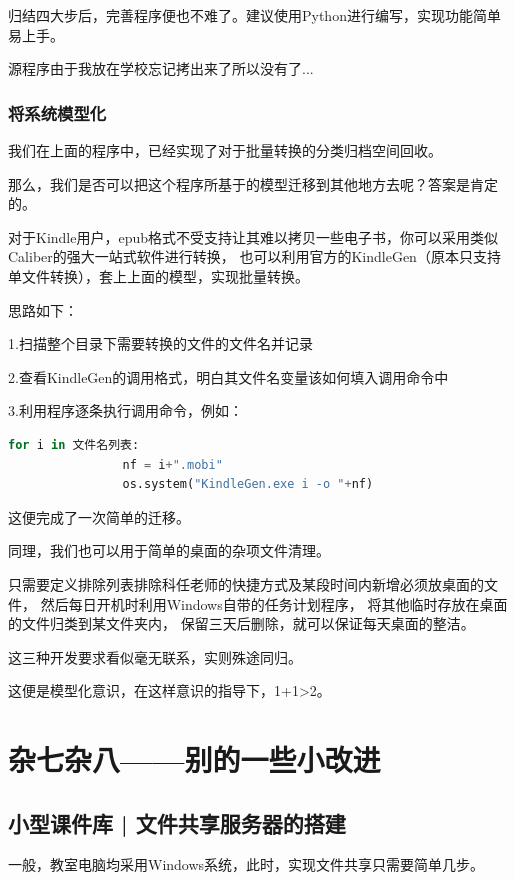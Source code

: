 \documentclass[a5paper]{article}
\begin{document}
        归结四大步后，完善程序便也不难了。建议使用Python进行编写，实现功能简单易上手。

        源程序由于我放在学校忘记拷出来了所以没有了...
        
        \subsubsection{将系统模型化}
        我们在上面的程序中，已经实现了对于批量转换的分类归档空间回收。

        那么，我们是否可以把这个程序所基于的模型迁移到其他地方去呢？答案是肯定的。

        对于Kindle用户，epub格式不受支持让其难以拷贝一些电子书，你可以采用类似Caliber的强大一站式软件进行转换，
        也可以利用官方的KindleGen（原本只支持单文件转换），套上上面的模型，实现批量转换。

        思路如下：

        1.扫描整个目录下需要转换的文件的文件名并记录

        2.查看KindleGen的调用格式，明白其文件名变量该如何填入调用命令中
        
        3.利用程序逐条执行调用命令，例如：
        
        \begin{lstlisting}[language={python}]
            for i in 文件名列表:
                nf = i+".mobi"
                os.system("KindleGen.exe i -o "+nf)
        \end{lstlisting}

        这便完成了一次简单的迁移。

        同理，我们也可以用于简单的桌面的杂项文件清理。
        
        只需要定义排除列表排除科任老师的快捷方式及某段时间内新增必须放桌面的文件，
        然后每日开机时利用Windows自带的任务计划程序，
        将其他临时存放在桌面的文件归类到某文件夹内，
        保留三天后删除，就可以保证每天桌面的整洁。

        这三种开发要求看似毫无联系，实则殊途同归。

        这便是模型化意识，在这样意识的指导下，1+1>2。

    \section{杂七杂八——别的一些小改进}
        \subsection{小型课件库 | 文件共享服务器的搭建}
        一般，教室电脑均采用Windows系统，此时，实现文件共享只需要简单几步。
        
\end{document}
